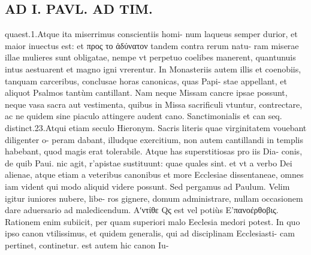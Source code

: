 \documentclass{article}
\begin{document}
\begin{pages}
\section*{AD I. PAVL. AD TIM. }
\marginpar{[ p.296 ]}\pstart quaest.1.Atque ita miserrimus conscientiis homi- num laqueus semper durior, et maior inuectus est: et προς το ἀδύνατον tandem contra rerum natu- ram miserae illae mulieres sunt obligatae, nempe vt perpetuo coelibes manerent, quantunuis intus aestuarent et magno igni vrerentur.  \pend\pstart In Monasteriis autem illis et coenobiis, tanquam carceribus, conclusae horas canonicas, quas Papi- stae appellant, et aliquot Psalmos tantùm cantillant. Nam neque  Missam cancre ipsae possunt, neque vasa sacra aut vestimenta, quibus in Missa sacrificuli vtuntur, contrectare, ac ne quidem sine piaculo attingere audent cano. Sanctimonialis et can seq. distinct.23.Atqui etiam seculo Hieronym. Sacris literis quae virginitatem vouebant diligenter o- peram dabant, illudque exercitium, non autem cantillandi in templis habebant, quod magis erat tolerabile. Atque has superstitiosas pro iis Dia- conis, de quib Paui. nic agit, r’apistae sustituunt: quae quales sint. et vt a verbo Dei alienae, atque etiam a veteribus canonibus et more Ecclesiae dissentaneae, omnes iam vident qui modo aliquid videre possunt. Sed pergamus ad Paulum.  \pend{} Velim igitur iuniores nubere, libe- ros gignere, domum administrare, nullam occasionem dare aduersario ad maledicendum.  \pend\pstart Αʹντίθε Qς est vel potiùs Ε’πανοέρθοβις. Rationem enim subiicit, per quam superiori malo Eeclesia medori potest. In quo ipso canon vtilissimus, et quidem generalis, qui ad disciplinam Ecclesiasti- cam pertinet, continetur. est autem hic canon Iu-  \pend

\end{pages}
\end{document}
